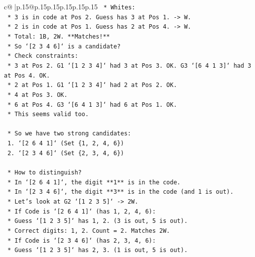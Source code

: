 \documentclass{article}
\begin{document}
{\begin{supertabular}{c@{$\;$}|p{.15\linewidth}@{}p{.15\linewidth}p{.15\linewidth}p{.15\linewidth}p{.15\linewidth}p{.15\linewidth}}
{{{\texttt{                    *   Whites:} \\
\texttt{                        *   3 is in code at Pos 2. Guess has 3 at Pos 1. {-}> W.} \\
\texttt{                        *   2 is in code at Pos 1. Guess has 2 at Pos 4. {-}> W.} \\
\texttt{                    *   Total: 1B, 2W. **Matches!**} \\
\texttt{            *   So `{[}2 3 4 6{]}` is a candidate?} \\
\texttt{                *   Check constraints:} \\
\texttt{                *   3 at Pos 2. G1 `{[}1 2 3 4{]}` had 3 at Pos 3. OK. G3 `{[}6 4 1 3{]}` had 3 at Pos 4. OK.} \\
\texttt{                *   2 at Pos 1. G1 `{[}1 2 3 4{]}` had 2 at Pos 2. OK.} \\
\texttt{                *   4 at Pos 3. OK.} \\
\texttt{                *   6 at Pos 4. G3 `{[}6 4 1 3{]}` had 6 at Pos 1. OK.} \\
\texttt{                *   This seems valid too.} \\
\\ 
\texttt{    *   So we have two strong candidates:} \\
\texttt{        1.  `{[}2 6 4 1{]}` (Set \{1, 2, 4, 6\})} \\
\texttt{        2.  `{[}2 3 4 6{]}` (Set \{2, 3, 4, 6\})} \\
\\ 
\texttt{    *   How to distinguish?} \\
\texttt{        *   In `{[}2 6 4 1{]}`, the digit **1** is in the code.} \\
\texttt{        *   In `{[}2 3 4 6{]}`, the digit **3** is in the code (and 1 is out).} \\
\texttt{        *   Let's look at G2 `{[}1 2 3 5{]}` {-}> 2W.} \\
\texttt{            *   If Code is `{[}2 6 4 1{]}` (has 1, 2, 4, 6):} \\
\texttt{                *   Guess `{[}1 2 3 5{]}` has 1, 2. (3 is out, 5 is out).} \\
\texttt{                *   Correct digits: 1, 2. Count = 2. Matches 2W.} \\
\texttt{            *   If Code is `{[}2 3 4 6{]}` (has 2, 3, 4, 6):} \\
\texttt{                *   Guess `{[}1 2 3 5{]}` has 2, 3. (1 is out, 5 is out).} \\
}}}
\end{supertabular}}
\end{document}
